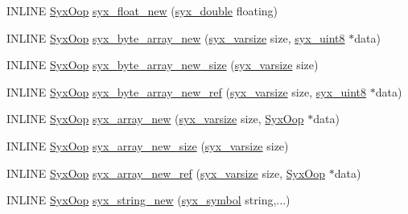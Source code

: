 \begin{CompactItemize}
\item 
INLINE \hyperlink{syx-types_8h_1121caba2d40b2ce090b640762744ccd}{SyxOop} \hyperlink{syx-object_8h_3685f2e5efa8127ecee98dd3f37f320c}{syx\_\-float\_\-new} (\hyperlink{syx-types_8h_cc7fcb78741daa005b6897ad40b7472b}{syx\_\-double} floating)
\item 
INLINE \hyperlink{syx-types_8h_1121caba2d40b2ce090b640762744ccd}{SyxOop} \hyperlink{syx-object_8h_637a68800765eeec4dcc041b9e2c51db}{syx\_\-byte\_\-array\_\-new} (\hyperlink{syx-types_8h_18e1a1417591a1efb670b97ce320f535}{syx\_\-varsize} size, \hyperlink{syx-types_8h_7cb1870b8124a88e807c98f315f3d923}{syx\_\-uint8} $\ast$data)
\item 
INLINE \hyperlink{syx-types_8h_1121caba2d40b2ce090b640762744ccd}{SyxOop} \hyperlink{syx-object_8h_7ef9b6014138610515cd6924192b1de2}{syx\_\-byte\_\-array\_\-new\_\-size} (\hyperlink{syx-types_8h_18e1a1417591a1efb670b97ce320f535}{syx\_\-varsize} size)
\item 
INLINE \hyperlink{syx-types_8h_1121caba2d40b2ce090b640762744ccd}{SyxOop} \hyperlink{syx-object_8h_0212b76e62e1e054559a7155504ff25e}{syx\_\-byte\_\-array\_\-new\_\-ref} (\hyperlink{syx-types_8h_18e1a1417591a1efb670b97ce320f535}{syx\_\-varsize} size, \hyperlink{syx-types_8h_7cb1870b8124a88e807c98f315f3d923}{syx\_\-uint8} $\ast$data)
\item 
INLINE \hyperlink{syx-types_8h_1121caba2d40b2ce090b640762744ccd}{SyxOop} \hyperlink{syx-object_8h_73d606c8733a400233809b9dbdffdfb1}{syx\_\-array\_\-new} (\hyperlink{syx-types_8h_18e1a1417591a1efb670b97ce320f535}{syx\_\-varsize} size, \hyperlink{syx-types_8h_1121caba2d40b2ce090b640762744ccd}{SyxOop} $\ast$data)
\item 
INLINE \hyperlink{syx-types_8h_1121caba2d40b2ce090b640762744ccd}{SyxOop} \hyperlink{syx-object_8h_bae072a6a2e20392d22f98e09fdc42c0}{syx\_\-array\_\-new\_\-size} (\hyperlink{syx-types_8h_18e1a1417591a1efb670b97ce320f535}{syx\_\-varsize} size)
\item 
INLINE \hyperlink{syx-types_8h_1121caba2d40b2ce090b640762744ccd}{SyxOop} \hyperlink{syx-object_8h_5c63c40451ce204441acff87eea226bc}{syx\_\-array\_\-new\_\-ref} (\hyperlink{syx-types_8h_18e1a1417591a1efb670b97ce320f535}{syx\_\-varsize} size, \hyperlink{syx-types_8h_1121caba2d40b2ce090b640762744ccd}{SyxOop} $\ast$data)
\item 
INLINE \hyperlink{syx-types_8h_1121caba2d40b2ce090b640762744ccd}{SyxOop} \hyperlink{syx-object_8h_ef1b7868c0a729cc4f27596291a9e08d}{syx\_\-string\_\-new} (\hyperlink{syx-types_8h_9663af54b7b72f5d8be5f754ef356525}{syx\_\-symbol} string,...)

\end{CompactItemize}
